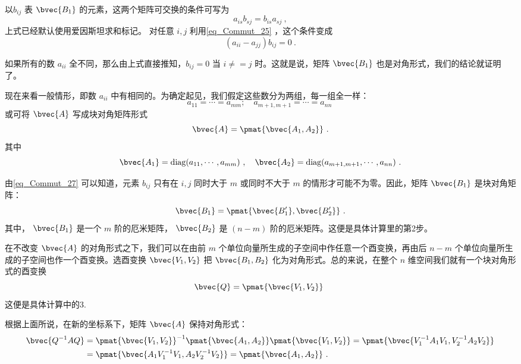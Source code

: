以$b_{ij}$ 表 $\bvec{B_1}$ 的元素，这两个矩阵可交换的条件可写为
\begin{equation}
a_{is}b_{sj}=b_{is}a_{sj}~,
\end{equation}
上式已经默认使用爱因斯坦求和标记。
对任意 $i,j$ 利用\autoref{eq_Commut_25} ，这个条件变成
\begin{equation}
(a_{ii}-a_{jj})b_{ij}=0
\label{eq_Commut_27}~.
\end{equation}

如果所有的数 $a_{ii}$ 全不同，那么由上式直接推知，$b_{ij}=0$ 当 $i\neq=j$ 时。这就是说，矩阵 $\bvec{B_1}$ 也是对角形式，我们的结论就证明了。

现在来看一般情形，即数 $a_{ii}$ 中有相同的。为确定起见，我们假定这些数分为两组，每一组全一样：
\begin{equation}
a_{11}=\cdots=a_{mm};\quad a_{m+1,m+1}=\cdots=a_{nn}~
\end{equation}
或可将 $\bvec{A}$ 写成块对角矩阵形式
\begin{equation}
\bvec{A}=\pmat{\bvec{A_1,A_2}}~.
\end{equation}
其中
\begin{equation}
\bvec{A_1}=\mathrm{diag}(a_{11},\cdots,a_{mm})~,\quad
\bvec{A_2}=\mathrm{diag}(a_{m+1,m+1},\cdots,a_{nn})~.
\end{equation}

由\autoref{eq_Commut_27} 可以知道，元素 $b_{ij}$ 只有在 $i,j$ 同时大于 $m$ 或同时不大于 $m$ 的情形才可能不为零。因此，矩阵 $\bvec{B_1}$ 是块对角矩阵：
\begin{equation}
\bvec{B_1}=\pmat{\bvec{B'_1},\bvec{B'_2}}~.
\end{equation}
其中， $\bvec{B_1}$ 是一个 $m$ 阶的厄米矩阵， $\bvec{B_2}$ 是 $(n-m)$ 阶的厄米矩阵。这便是具体计算里的第2步。

在不改变 $\bvec{A}$ 的对角形式之下，我们可以在由前 $m$ 个单位向量所生成的子空间中作任意一个酉变换，再由后 $n-m$ 个单位向量所生成的子空间也作一个酉变换。选酉变换 $\bvec{V_1,V_2}$ 把 $\bvec{B_1,B_2}$ 化为对角形式。总的来说，在整个 $n$ 维空间我们就有一个块对角形式的酉变换
\begin{equation}
\bvec{Q}=\pmat{\bvec{V_1,V_2}}~
\end{equation}
这便是具体计算中的3.

根据上面所说，在新的坐标系下，矩阵 $\bvec{A}$ 保持对角形式：
\begin{equation}
\begin{aligned}
\bvec{Q^{-1}AQ}&=\pmat{\bvec{V_1,V_2}}^{-1}\pmat{\bvec{A_1,A_2}}\pmat{\bvec{V_1,V_2}}=\pmat{\bvec{V_1^{-1}A_1V_1,V_2^{-1}A_2V_2}}\\
&=\pmat{\bvec{A_1V_1^{-1}V_1,A_2V_2^{-1}V_2}}=\pmat{\bvec{A_1,A_2}}~.
\end{aligned}
\end{equation}


